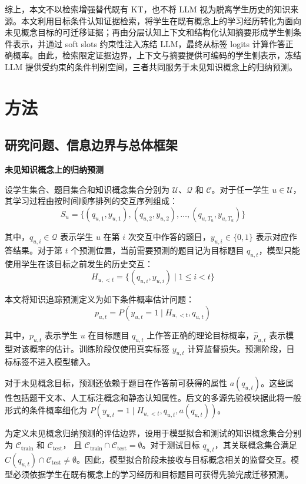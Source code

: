 \documentclass[UTF8,a4paper,12pt]{ctexart}
\numberwithin{table}{section}
\begin{document}
综上，本文不以检索增强替代既有 KT，也不将 LLM 视为脱离学生历史的知识来源。本文利用目标条件认知证据检索，将学生在既有概念上的学习经历转化为面向未见概念目标的可迁移证据；再由分层认知上下文和结构化认知摘要形成学生侧条件表示，并通过 soft slots 约束性注入冻结 LLM，最终从标签 logits 计算作答正确概率。由此，检索限定证据边界，上下文与摘要提供可编码的学生侧表示，冻结 LLM 提供受约束的条件判别空间，三者共同服务于未见知识概念上的归纳预测。

\section{方法}

\subsection{研究问题、信息边界与总体框架}

\noindent\textbf{未见知识概念上的归纳预测}



设学生集合、题目集合和知识概念集合分别为 \(\mathcal{U}\)、\(\mathcal{Q}\) 和 \(\mathcal{C}\)。对于任一学生 \(u\in\mathcal{U}\)，其学习过程由按时间顺序排列的交互序列组成：
\[
S_u=\{(q_{u,1},y_{u,1}),(q_{u,2},y_{u,2}),\ldots,(q_{u,T_u},y_{u,T_u})\}
\]



其中，\(q_{u,i}\in\mathcal{Q}\) 表示学生 \(u\) 在第 \(i\) 次交互中作答的题目，\(y_{u,i}\in\{0,1\}\) 表示对应作答结果。对于第 \(t\) 个预测位置，当前需要预测的题目记为目标题目 \(q_{u,t}\)，模型只能使用学生在该目标之前发生的历史交互：
\[
H_{u,<t}=\{(q_{u,i},y_{u,i})\mid 1\leq i<t\}
\]

本文将知识追踪预测定义为如下条件概率估计问题：
\[
p_{u,t}=P(y_{u,t}=1\mid H_{u,<t},q_{u,t})
\]



其中，\(p_{u,t}\) 表示学生 \(u\) 在目标题目 \(q_{u,t}\) 上作答正确的理论目标概率，\(\hat{p}_{u,t}\) 表示模型对该概率的估计。训练阶段仅使用真实标签 \(y_{u,t}\) 计算监督损失。预测阶段，目标标签不进入模型输入。

对于未见概念目标，预测还依赖于题目在作答前可获得的属性 \(a(q_{u,t})\)。这些属性包括题干文本、人工标注概念和静态认知属性。后文的多源先验模块据此将一般形式的条件概率细化为 \(P(y_{u,t}=1\mid H_{u,<t},q_{u,t},a(q_{u,t}))\)。

为定义未见概念归纳预测的评估边界，设用于模型拟合和测试的知识概念集合分别为 
\(\mathcal{C}_{\mathrm{train}}\) 和 \(\mathcal{C}_{\mathrm{test}}\)，
且 \(\mathcal{C}_{\mathrm{train}}\cap\mathcal{C}_{\mathrm{test}}=\emptyset\)。对于测试目标 \(q_{u,t}\)，其关联概念集合满足 \(C(q_{u,t})\cap\mathcal{C}_{\mathrm{test}}\neq\emptyset\)。因此，模型拟合阶段未接收与目标概念相关的监督交互。模型必须依据学生在既有概念上的学习经历和目标题目可获得先验完成迁移预测。
\end{document}
